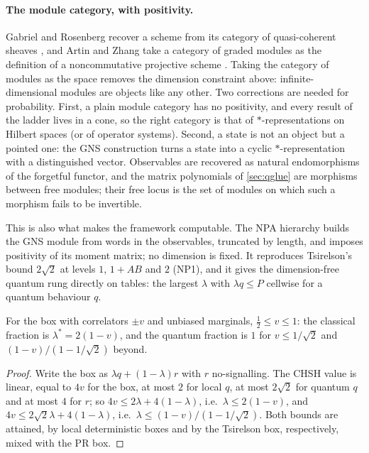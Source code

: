 \documentclass[11pt]{article}
\theoremstyle{definition}\newtheorem{definition}[theorem]{Definition}\newtheorem{remark}[theorem]{Remark}\newtheorem{example}[theorem]{Example}
\begin{document}
\paragraph{The module category, with positivity.}
Gabriel and Rosenberg recover a scheme from its category of quasi-coherent sheaves \cite{Gabriel1962,Rosenberg1998}, and Artin and Zhang take
a category of graded modules as the definition of a noncommutative projective scheme \cite{ArtinZhang1994}. Taking the category of modules as
the space removes the dimension constraint above: infinite-dimensional modules are objects like any other. Two corrections are needed for
probability. First, a plain module category has no positivity, and every result of the ladder lives in a cone, so the right category is that
of $*$-representations on Hilbert spaces (or of operator systems). Second, a state is not an object but a pointed one: the GNS construction
turns a state into a cyclic $*$-representation with a distinguished vector. Observables are recovered as natural endomorphisms of the
forgetful functor, and the matrix polynomials of \cref{sec:qglue} are morphisms between free modules; their free locus is the set of modules
on which such a morphism fails to be invertible.

This is also what makes the framework computable. The NPA hierarchy \cite{NPA2007,NPA2008} builds the GNS module from words in the
observables, truncated by length, and imposes positivity of its moment matrix; no dimension is fixed. It reproduces Tsirelson's bound
$2\sqrt2$ at levels $1$, $1{+}AB$ and $2$ (NP1), and it gives the dimension-free quantum rung directly on tables: the largest $\lambda$ with
$\lambda q\le P$ cellwise for a quantum behaviour $q$.

\begin{proposition}\label{prop:iso}
For the box with correlators $\pm v$ and unbiased marginals, $\tfrac12\le v\le1$: the classical fraction is $\lambda^*=2(1-v)$, and the quantum
fraction is $1$ for $v\le1/\sqrt2$ and $(1-v)/(1-1/\sqrt2)$ beyond.
\end{proposition}

\begin{proof}
Write the box as $\lambda q+(1-\lambda)r$ with $r$ no-signalling. The CHSH value is linear, equal to $4v$ for the box, at most $2$ for local $q$,
at most $2\sqrt2$ for quantum $q$ and at most $4$ for $r$; so $4v\le2\lambda+4(1-\lambda)$, i.e.\ $\lambda\le2(1-v)$, and $4v\le2\sqrt2\lambda+
4(1-\lambda)$, i.e.\ $\lambda\le(1-v)/(1-1/\sqrt2)$. Both bounds are attained, by local deterministic boxes and by the Tsirelson box,
respectively, mixed with the PR box.
\end{proof}
\end{document}
